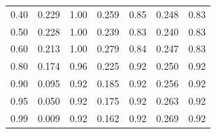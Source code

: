 \begin{table}[h!]
\begin{minipage}[t]{0.48\textwidth}
\begin{tabular}{ccccccc}
0.40 & 0.229 & 1.00 & 0.259 & 0.85 & 0.248 & 0.83 \\
0.50 & 0.228 & 1.00 & 0.239 & 0.83 & 0.240 & 0.83 \\
0.60 & 0.213 & 1.00 & 0.279 & 0.84 & 0.247 & 0.83 \\
0.80 & 0.174 & 0.96 & 0.225 & 0.92 & 0.250 & 0.92 \\
0.90 & 0.095 & 0.92 & 0.185 & 0.92 & 0.256 & 0.92 \\
0.95 & 0.050 & 0.92 & 0.175 & 0.92 & 0.263 & 0.92 \\
0.99 & 0.009 & 0.92 & 0.162 & 0.92 & 0.269 & 0.92 \\
\bottomrule
\end{tabular}
\end{minipage}
\end{table}

